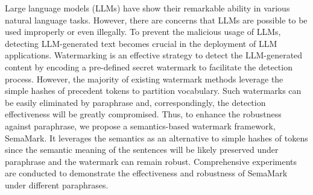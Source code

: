 Large language models (LLMs) have show their remarkable ability in various natural language tasks. However, there are concerns that LLMs are possible to be used improperly or even illegally. To prevent the malicious usage of LLMs, detecting LLM-generated text becomes crucial in the deployment of LLM applications. Watermarking is an effective strategy to detect the LLM-generated content by encoding a pre-defined secret watermark to facilitate the detection process. However, the majority of existing watermark methods leverage the simple hashes of precedent tokens to partition vocabulary. Such watermarks can be easily eliminated by paraphrase and, correspondingly, the detection effectiveness will be greatly compromised. Thus, to enhance the robustness against paraphrase, we propose a semantics-based watermark framework, SemaMark. It leverages the semantics as an alternative to simple hashes of tokens since the semantic meaning of the sentences will be likely preserved under paraphrase and the watermark can remain robust. Comprehensive experiments are conducted to demonstrate the effectiveness and robustness of SemaMark under different paraphrases.